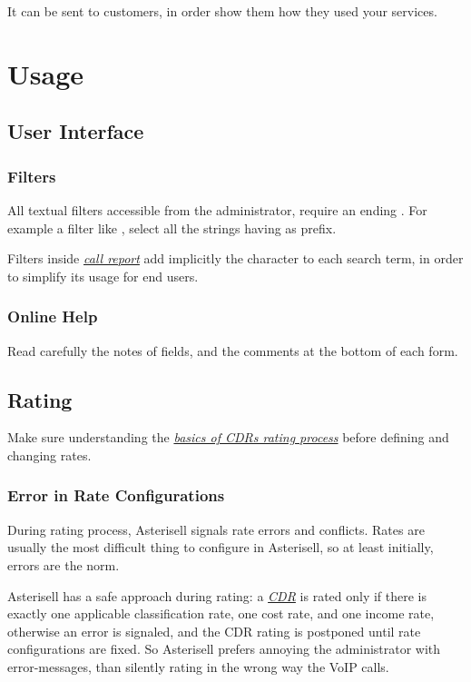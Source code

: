 \documentclass[letterpaper,10pt,english]{sphinxmanual}
\begin{document}
It can be sent to customers, in order show them how they used your services.


\chapter{Usage}
\label{index:usage}

\section{User Interface}
\label{index:user-interface}

\subsection{Filters}
\label{index:filters}
All textual filters accessible from the administrator, require an ending \code{*}. For example a filter like , select all the strings having  as prefix.

Filters inside {\hyperref[index:term-call-report]{\emph{call report}}} add implicitly the \code{*} character to each search term, in order to simplify its usage for end users.


\subsection{Online Help}
\label{index:online-help}
Read carefully the notes of fields, and the comments at the bottom of each form.


\section{Rating}
\label{index:rating}
Make sure understanding the {\hyperref[index:cdr-rating-process]{\emph{basics of CDRs rating process}}} before defining and changing rates.


\subsection{Error in Rate Configurations}
\label{index:error-in-rate-configurations}
During rating process, Asterisell signals rate errors and conflicts. Rates are usually the most difficult thing to configure in Asterisell, so at least initially, errors are the norm.

Asterisell has a safe approach during rating: a {\hyperref[index:term-cdr]{\emph{CDR}}} is rated only if there is exactly one applicable classification rate, one cost rate, and one income rate, otherwise an error is signaled, and the CDR rating is postponed until rate configurations are fixed. So Asterisell prefers annoying the administrator with error-messages, than silently rating in the wrong way the VoIP calls.
\end{document}
